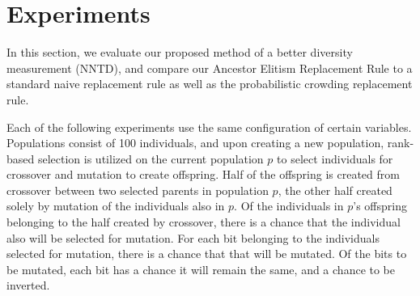 \section{Experiments}
In this section, we evaluate our proposed method of a better diversity measurement (NNTD), and compare our Ancestor Elitism Replacement Rule to a standard naive replacement rule as well as the probabilistic crowding replacement rule.

Each of the following experiments use the same configuration of certain variables. Populations consist of \num{100} individuals, and upon creating a new population, rank-based selection is utilized on the current population $p$ to select individuals for crossover and mutation to create offspring. Half of the offspring is created from crossover between two selected parents in population $p$, the other half created solely by mutation of the individuals also in $p$. Of the individuals in $p$'s offspring belonging to the half created by crossover, there is a  chance that the individual also will be selected for mutation. For each bit belonging to the individuals selected for mutation, there is a  chance that that will be mutated. Of the bits to be mutated, each bit has a  chance it will remain the same, and a  chance to be inverted.




